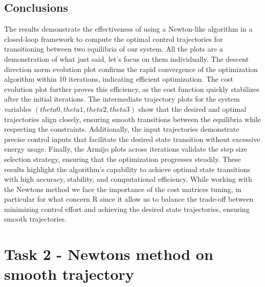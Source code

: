 \documentclass[a4paper,11pt,oneside]{book}
\begin{document}
\section{Conclusions}

\begin{justify}
    {The results demonstrate the effectiveness of using a Newton-like algorithm in a closed-loop framework to compute the optimal control trajectories for transitioning between two equilibria of our system. All the plots are a demonstration of what just said, let's focus on them individually. The descent direction norm evolution plot confirms the rapid convergence of the optimization algorithm within 10 iterations, indicating efficient optimization. The cost evolution plot further proves this efficiency, as the cost function quickly stabilizes after the initial iterations. The intermediate trajectory plots for the system variables $(theta0, theta1, theta2, theta3)$ show that the desired and optimal trajectories align closely, ensuring smooth transitions between the equilibria while respecting the constraints. Additionally, the input trajectories demonstrate precise control inputs that facilitate the desired state transition without excessive energy usage. Finally, the Armijo plots across iterations validate the step size selection strategy, ensuring that the optimization progresses steadily. These results highlight the algorithm's capability to achieve optimal state transitions with high accuracy, stability, and computational efficiency. While working with the Newton\textquotesingle s method we face the importance of the cost matrices tuning, in particular for what concern R since it allow us to balance the trade-off between minimizing control effort and achieving the desired state trajectories, ensuring smooth trajectories.}
\end{justify}

\chapter{Task 2 - Newton\textquotesingle s method on smooth trajectory}
\end{document}
